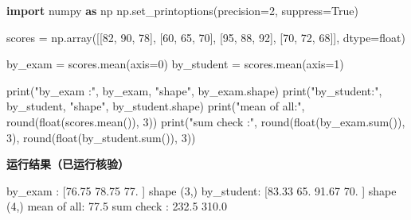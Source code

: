 \documentclass[
]{article}
\newenvironment{Shaded}{}{}
\newcommand{\BuiltInTok}[1]{\textcolor[rgb]{0.00,0.50,0.00}{#1}}
\newcommand{\DecValTok}[1]{\textcolor[rgb]{0.25,0.63,0.44}{#1}}
\newcommand{\ImportTok}[1]{\textcolor[rgb]{0.00,0.50,0.00}{\textbf{#1}}}
\newcommand{\NormalTok}[1]{#1}
\newcommand{\OperatorTok}[1]{\textcolor[rgb]{0.40,0.40,0.40}{#1}}
\newcommand{\StringTok}[1]{\textcolor[rgb]{0.25,0.44,0.63}{#1}}
\newcommand{\VariableTok}[1]{\textcolor[rgb]{0.10,0.09,0.49}{#1}}
\begin{document}
\begin{Shaded}
\begin{Highlighting}[]
\ImportTok{import}\NormalTok{ numpy }\ImportTok{as}\NormalTok{ np}
\NormalTok{np.set\_printoptions(precision}\OperatorTok{=}\DecValTok{2}\NormalTok{, suppress}\OperatorTok{=}\VariableTok{True}\NormalTok{)}

\NormalTok{scores }\OperatorTok{=}\NormalTok{ np.array([[}\DecValTok{82}\NormalTok{, }\DecValTok{90}\NormalTok{, }\DecValTok{78}\NormalTok{],}
\NormalTok{                   [}\DecValTok{60}\NormalTok{, }\DecValTok{65}\NormalTok{, }\DecValTok{70}\NormalTok{],}
\NormalTok{                   [}\DecValTok{95}\NormalTok{, }\DecValTok{88}\NormalTok{, }\DecValTok{92}\NormalTok{],}
\NormalTok{                   [}\DecValTok{70}\NormalTok{, }\DecValTok{72}\NormalTok{, }\DecValTok{68}\NormalTok{]], dtype}\OperatorTok{=}\BuiltInTok{float}\NormalTok{)}

\NormalTok{by\_exam }\OperatorTok{=}\NormalTok{ scores.mean(axis}\OperatorTok{=}\DecValTok{0}\NormalTok{)}
\NormalTok{by\_student }\OperatorTok{=}\NormalTok{ scores.mean(axis}\OperatorTok{=}\DecValTok{1}\NormalTok{)}

\BuiltInTok{print}\NormalTok{(}\StringTok{"by\_exam   :"}\NormalTok{, by\_exam, }\StringTok{"shape"}\NormalTok{, by\_exam.shape)}
\BuiltInTok{print}\NormalTok{(}\StringTok{"by\_student:"}\NormalTok{, by\_student, }\StringTok{"shape"}\NormalTok{, by\_student.shape)}
\BuiltInTok{print}\NormalTok{(}\StringTok{"mean of all:"}\NormalTok{, }\BuiltInTok{round}\NormalTok{(}\BuiltInTok{float}\NormalTok{(scores.mean()), }\DecValTok{3}\NormalTok{))}
\BuiltInTok{print}\NormalTok{(}\StringTok{"sum check :"}\NormalTok{, }\BuiltInTok{round}\NormalTok{(}\BuiltInTok{float}\NormalTok{(by\_exam.}\BuiltInTok{sum}\NormalTok{()), }\DecValTok{3}\NormalTok{), }\BuiltInTok{round}\NormalTok{(}\BuiltInTok{float}\NormalTok{(by\_student.}\BuiltInTok{sum}\NormalTok{()), }\DecValTok{3}\NormalTok{))}
\end{Highlighting}
\end{Shaded}

\textbf{运行结果（已运行核验）}

\begin{Shaded}
\begin{Highlighting}[]
\NormalTok{by\_exam   : [76.75 78.75 77.  ] shape (3,)}
\NormalTok{by\_student: [83.33 65.   91.67 70.  ] shape (4,)}
\NormalTok{mean of all: 77.5}
\NormalTok{sum check : 232.5 310.0}
\end{Highlighting}
\end{Shaded}
\end{document}
